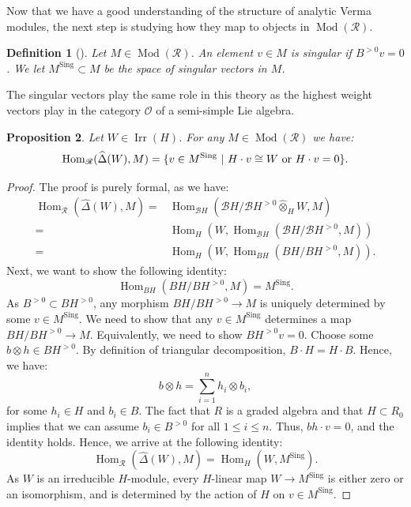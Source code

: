 \documentclass{amsart}
\newtheorem{defi}{ Definition}[subsection]
\newtheorem{prop}[defi]{ Proposition}
\newcommand{\Hom}{\operatorname{Hom}}
\newcommand{\Mod}{\operatorname{Mod}}
\newcommand{\OX}{\mathcal{O}}
\begin{document}
Now that we have a good understanding of the structure of analytic Verma modules, the next step is studying how they map to objects in $\Mod(\mathscr{R})$.
\begin{defi}[{\cite[Definition 3.23.]{etingof2010lecture}}]
Let $M\in \Mod(\mathscr{R})$. An element $v\in M$ is singular if $B^{>0}v=0$. We let $M^{\operatorname{Sing}}\subset M$ be the space of singular vectors in $M$.
\end{defi}
The singular vectors play the same role in this theory as the highest weight vectors play in the category $\OX$ of a semi-simple Lie algebra. 
\begin{prop}\label{prop maps from Verma}
Let $W\in\operatorname{Irr}(H)$. For any $M\in \Mod(\mathscr{R})$ we have:
\begin{equation*}
   \Hom_{\mathscr{R}}(\widehat{\Delta}(W),M)=\{ v\in M^{\operatorname{Sing}} \textnormal{ }\vert\textnormal{ } H\cdot v\cong W \textnormal{ or } H\cdot v=0 \}. 
\end{equation*}
\end{prop}
\begin{proof}
The proof is purely formal, as we have:
\begin{align*}
    \Hom_{\mathscr{R}}(\widehat{\Delta}(W),M)=&\Hom_{\mathscr{B}H}(\mathscr{B}H/\mathscr{B}H^{>0}\widehat{\otimes}_{H} W,M)\\=&
    \Hom_{H}(W,\Hom_{\mathscr{B}H}(\mathscr{B}H/\mathscr{B}H^{>0},M))\\=&\Hom_{H}(W,\Hom_{BH}(BH/BH^{>0},M)). 
\end{align*}
Next, we want to show the following identity:
\begin{equation*}
    \Hom_{BH}(BH/BH^{>0},M)=M^{\operatorname{Sing}}.
\end{equation*}
As $B^{>0}\subset BH^{>0}$, any morphism $BH/BH^{>0}\rightarrow M$ is uniquely determined by some $v\in M^{\operatorname{Sing}}$. We need to show that any $v\in M^{\operatorname{Sing}}$ determines a map $BH/BH^{>0}\rightarrow M$. Equivalently, we need to show $BH^{>0}v=0$. Choose some $b\otimes h\in BH^{>0}$. By definition of triangular decomposition, $B\cdot H =H\cdot B$. Hence, we have:
\begin{equation*}
    b\otimes h=\sum_{i=1}^nh_i\otimes b_i,
\end{equation*}
for some $h_i\in H$ and $b_i\in B$. The fact that $R$ is a graded algebra and that $H\subset R_0$ implies that we can assume $b_i\in B^{>0}$ for all $1\leq i \leq n$. Thus, $bh\cdot v=0$, and the identity holds. Hence, we arrive at the following identity:
\begin{equation*}
   \Hom_{\mathscr{R}}(\widehat{\Delta}(W),M)= \Hom_{H}(W, M^{\operatorname{Sing}}).
\end{equation*}
As $W$ is an irreducible $H$-module, every $H$-linear map $W\rightarrow M^{\operatorname{Sing}}$ is either zero or an isomorphism, and is determined by the action of $H$ on $v\in M^{\operatorname{Sing}}$.
\end{proof}
\end{document}
